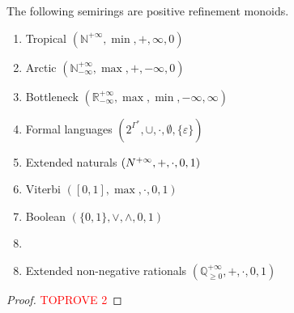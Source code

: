 \documentclass[a4paper,UKenglish,cleveref, autoref, thm-restate]{lipics-v2021}
\newcommand{\exN}{\mathbb{N}^{+\infty}}
\newcommand{\exQp}{\mathbb{Q}_{\geq0}^{+\infty}}
\theoremstyle{plain}\newtheoremrep{thm}{Theorem}[section]
\begin{document}
	\begin{toappendix}
		\begin{lem}
			The following semirings are positive refinement monoids.
			\begin{multicols}{2}
				\begin{enumerate}[nosep]
					\item Tropical $(\exN, \min, +, \infty, 0)$
					\item Arctic  $(\mathbb N^{+\infty}_{-\infty}, \max, +, -\infty, 0)$
					\item Bottleneck  $(\mathbb R^{+\infty}_{-\infty}, \max, \min, -\infty, \infty)$
					\item Formal languages  $(2^{\Gamma^*}, \cup, \cdot, \emptyset, \{\varepsilon\})$
					\item Extended naturals  $(\mathbb \exN, +, \cdot, 0, 1)$
					\item Viterbi  $([0,1], \max, \cdot, 0, 1)$
					\item Boolean  $(\{0,1\}, \lor, \land, 0, 1)$
					\item[]
				\end{enumerate}
			\end{multicols}
			\begin{enumerate}[nosep]
				\setcounter{enumi}{7}
				\item Extended non-negative rationals $(\exQp, +, \cdot, 0, 1)$
			\end{enumerate}\label{posrefsemis}
		\end{lem}
		\begin{proof}\textcolor{red}{TOPROVE 2}\end{proof}
		

\end{toappendix}
\end{document}
